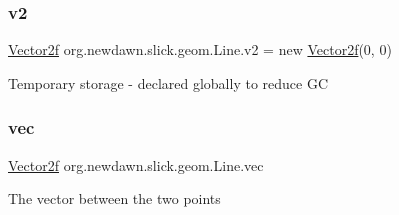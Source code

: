 \subsubsection{\texorpdfstring{v2}{v2}}
{\footnotesize\ttfamily \mbox{\hyperlink{classorg_1_1newdawn_1_1slick_1_1geom_1_1_vector2f}{Vector2f}} org.\+newdawn.\+slick.\+geom.\+Line.\+v2 = new \mbox{\hyperlink{classorg_1_1newdawn_1_1slick_1_1geom_1_1_vector2f}{Vector2f}}(0, 0)\hspace{0.3cm}{\ttfamily [private]}}

Temporary storage -\/ declared globally to reduce GC \mbox{\label{classorg_1_1newdawn_1_1slick_1_1geom_1_1_line_ad7a92ee3401b8b07f490cf5cee1f71aa}} 
\subsubsection{\texorpdfstring{vec}{vec}}
{\footnotesize\ttfamily \mbox{\hyperlink{classorg_1_1newdawn_1_1slick_1_1geom_1_1_vector2f}{Vector2f}} org.\+newdawn.\+slick.\+geom.\+Line.\+vec\hspace{0.3cm}{\ttfamily [private]}}

The vector between the two points 
